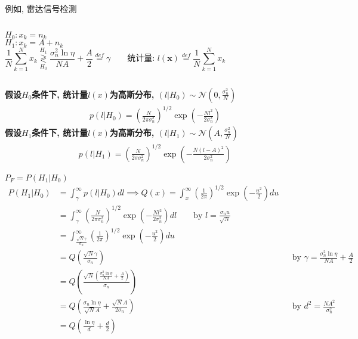 \begin{frame}[shrink]{例如, 雷达信号检测}
\begin{columns}
$H_0:x_k=n_k$\\
$H_1:x_k=A+n_k$
\[
\frac{1}{N}\sum\limits_{k=1}^{N}x_k\mathop{\gtrless}\limits_{H_0}^{H_1}\frac{\sigma_n^2\ln\eta}{NA}+\frac{A}{2}\mathop{=}\limits^{def}\gamma \qquad \textbf{统计量: }l(\bm{x})\mathop{=}\limits^{def}\frac{1}{N}\sum\limits_{k=1}^{N}x_k
\]
\end{columns}
\textbf{假设$H_0$条件下, 统计量$l(x)$为高斯分布, $(l|H_0)\sim\mathcal{N}(0,\frac{\sigma_n^2}{N})$}
\begin{align*}
p(l|H_0)=\left(\frac{N}{2\pi\sigma_n^2}\right)^{1/2}\exp\left(-\frac{Nl^2}{2\sigma_n^2}\right)
\end{align*}
\textbf{假设$H_1$条件下, 统计量$l(x)$为高斯分布, $(l|H_1)\sim\mathcal{N}(A,\frac{\sigma_n^2}{N})$}
\begin{align*}
p(l|H_1)=\left(\frac{N}{2\pi\sigma_n^2}\right)^{1/2}\exp\left(-\frac{N(l-A)^2}{2\sigma_n^2}\right)
\end{align*}
\end{frame}

\begin{frame}[shrink]{$P_F=P(H_1|H_0)$}
\begin{align*}
P(H_1|H_0)&=\int_{\gamma}^{\infty}p(l|H_0)dl\implies Q(x)=\int_{x}^{\infty}\left(\frac{1}{2\pi}\right)^{1/2}\exp\left(-\frac{u^2}{2}\right)du\\
&=\int_{\gamma}^{\infty}\left(\frac{N}{2\pi\sigma_n^2}\right)^{1/2}\exp\left(-\frac{Nl^2}{2\sigma_n^2}\right)dl\qquad \text{by } l=\frac{\sigma_nu}{\sqrt{N}}\\
&=\int_{\frac{\sqrt{N}\gamma}{\sigma_n}}^{\infty}\left(\frac{1}{2\pi}\right)^{1/2}\exp\left(-\frac{u^2}{2}\right)du\\
&=Q\left(\frac{\sqrt{N}\gamma}{\sigma_n}\right) &&\text{by } \gamma=\frac{\sigma_n^2\ln\eta}{NA}+\frac{A}{2}\\
&=Q\left(\frac{\sqrt{N}\left(\frac{\sigma_n^2\ln\eta}{NA}+\frac{A}{2}\right)}{\sigma_n}\right)\\
&=Q\left(\frac{\sigma_n\ln\eta}{\sqrt{N}A}+\frac{\sqrt{N}A}{2\sigma_n}\right) &&\text{by }d^2=\frac{NA^2}{\sigma_n^2}\\
&=Q\left(\frac{\ln\eta}{d}+\frac{d}{2}\right)
\end{align*}
\end{frame}

